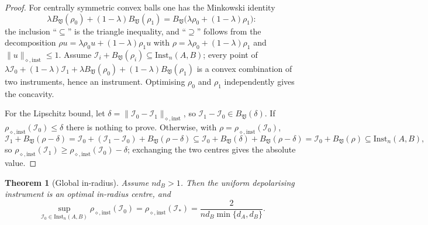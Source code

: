 \documentclass[11pt,a4paper]{article}
\newtheorem{theorem}{Theorem}[section]
\newcommand{\Inst}{\mathrm{Inst}}
\begin{document}
\begin{proof}
For centrally symmetric convex balls one has the Minkowski identity
\[
\lambda B_{\mathfrak V}(\rho_0)+(1-\lambda)B_{\mathfrak V}(\rho_1)
=B_{\mathfrak V}\big(\lambda\rho_0+(1-\lambda)\rho_1\big):
\]
the inclusion ``$\subseteq$'' is the triangle inequality, and ``$\supseteq$'' follows from the decomposition $\rho u=\lambda\rho_0u+(1-\lambda)\rho_1u$ with $\rho=\lambda\rho_0+(1-\lambda)\rho_1$ and $\|u\|_{\diamond,\mathrm{inst}}\le1$. Assume $\mathcal I_i+B_{\mathfrak V}(\rho_i)\subseteq\Inst_n(A,B)$; every point of $\lambda\mathcal I_0+(1-\lambda)\mathcal I_1+\lambda B_{\mathfrak V}(\rho_0)+(1-\lambda)B_{\mathfrak V}(\rho_1)$ is a convex combination of two instruments, hence an instrument. Optimising $\rho_0$ and $\rho_1$ independently gives the concavity.

For the Lipschitz bound, let $\delta=\|\mathcal I_0-\mathcal I_1\|_{\diamond,\mathrm{inst}}$, so $\mathcal I_1-\mathcal I_0\in B_{\mathfrak V}(\delta)$. If $\rho_{\diamond,\mathrm{inst}}(\mathcal I_0)\le\delta$ there is nothing to prove. Otherwise, with $\rho=\rho_{\diamond,\mathrm{inst}}(\mathcal I_0)$,
\[
\mathcal I_1+B_{\mathfrak V}(\rho-\delta)
=\mathcal I_0+(\mathcal I_1-\mathcal I_0)+B_{\mathfrak V}(\rho-\delta)
\subseteq\mathcal I_0+B_{\mathfrak V}(\delta)+B_{\mathfrak V}(\rho-\delta)
=\mathcal I_0+B_{\mathfrak V}(\rho)
\subseteq\Inst_n(A,B),
\]
so $\rho_{\diamond,\mathrm{inst}}(\mathcal I_1)\ge\rho_{\diamond,\mathrm{inst}}(\mathcal I_0)-\delta$; exchanging the two centres gives the absolute value.
\end{proof}

\begin{theorem}[Global in-radius]
\label{thm:global-inradius}
Assume $nd_B>1$. Then the uniform depolarising instrument is an optimal in-radius centre, and
\[
\sup_{\mathcal I_0\in\Inst_n(A,B)}\rho_{\diamond,\mathrm{inst}}(\mathcal I_0)
=\rho_{\diamond,\mathrm{inst}}(\mathcal I_*)
=\frac{2}{nd_B\min\{d_A,d_B\}}.
\]
\end{theorem}
\end{document}
